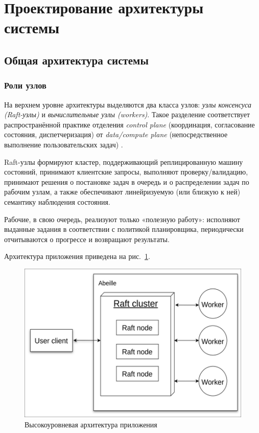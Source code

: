 \section{Проектирование архитектуры системы}

\subsection{Общая архитектура системы}

\subsubsection{Роли узлов}

На верхнем уровне архитектуры выделяются два класса узлов: \emph{узлы
консенсуса (Raft-узлы)} и \emph{вычислительные узлы (workers)}. Такое
разделение соответствует распространённой практике отделения \emph{control
plane} (координация, согласование состояния, диспетчеризация) от
\emph{data/compute plane} (непосредственное выполнение пользовательских задач)
\cite{coulouris2012}.

Raft-узлы формируют кластер, поддерживающий реплицированную машину состояний,
принимают клиентские запросы, выполняют проверку/валидацию, принимают решения о
постановке задач в очередь и о распределении задач по рабочим узлам, а также
обеспечивают линейризуемую (или близкую к ней) семантику наблюдения состояния.

Рабочие, в свою очередь, реализуют только «полезную работу»: исполняют выданные
задания в соответствии с политикой планировщика, периодически отчитываются о
прогрессе и возвращают результаты.

Архитектура приложения приведена на рис.~\ref{fig:arch-overview}.

\begin{figure}
  \centering
  \includegraphics[scale=0.4]{inc/arch-overview.png}
  \caption{Высокоуровневая архитектура приложения}
  \label{fig:arch-overview}
\end{figure}

